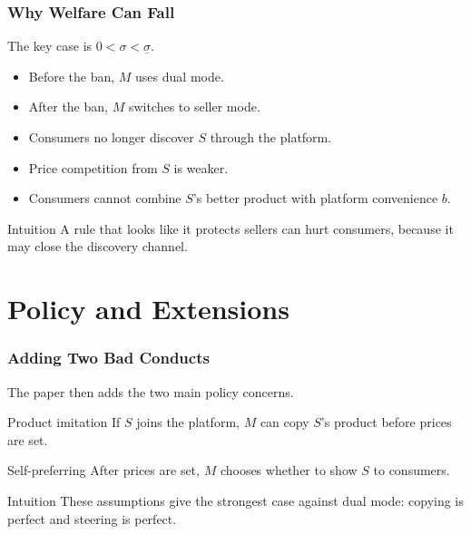 \documentclass[aspectratio=169,AutoFakeBold,AutoFakeSlant]{beamer}
\begin{document}
\begin{frame}
  \frametitle{Why Welfare Can Fall}
  \small
  The key case is $0<\sigma<\underline{\sigma}$.

  \begin{itemize}
    \item Before the ban, $M$ uses dual mode.
    \item After the ban, $M$ switches to seller mode.
    \item Consumers no longer discover $S$ through the platform.
    \item Price competition from $S$ is weaker.
    \item Consumers cannot combine $S$'s better product with platform convenience $b$.
  \end{itemize}

  \begin{block}{Intuition}
    A rule that looks like it protects sellers can hurt consumers, because it may close the discovery channel.
  \end{block}
\end{frame}

\section{Policy and Extensions}

\begin{frame}
  \frametitle{Adding Two Bad Conducts}
  \small
  The paper then adds the two main policy concerns.

  \begin{block}{Product imitation}
    If $S$ joins the platform, $M$ can copy $S$'s product before prices are set.
  \end{block}

  \begin{block}{Self-preferring}
    After prices are set, $M$ chooses whether to show $S$ to consumers.
  \end{block}

  \begin{alertblock}{Intuition}
    These assumptions give the strongest case against dual mode: copying is perfect and steering is perfect.
  \end{alertblock}
\end{frame}
\end{document}

